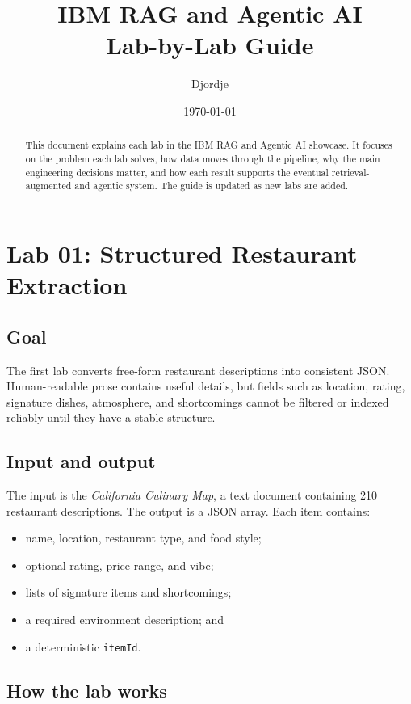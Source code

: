 \documentclass[11pt]{article}
\title{IBM RAG and Agentic AI\\Lab-by-Lab Guide}
\author{Djordje}
\date{\today}
\begin{document}
\maketitle

\begin{abstract}
This document explains each lab in the IBM RAG and Agentic AI showcase.
It focuses on the problem each lab solves, how data moves through the
pipeline, why the main engineering decisions matter, and how each result
supports the eventual retrieval-augmented and agentic system. The guide is
updated as new labs are added.
\end{abstract}

\tableofcontents
\newpage

\section{Lab 01: Structured Restaurant Extraction}

\subsection{Goal}

The first lab converts free-form restaurant descriptions into consistent JSON.
Human-readable prose contains useful details, but fields such as location,
rating, signature dishes, atmosphere, and shortcomings cannot be filtered or
indexed reliably until they have a stable structure.

\subsection{Input and output}

The input is the \emph{California Culinary Map}, a text document containing 210
restaurant descriptions. The output is a JSON array. Each item contains:

\begin{itemize}[nosep]
  \item name, location, restaurant type, and food style;
  \item optional rating, price range, and vibe;
  \item lists of signature items and shortcomings;
  \item a required environment description; and
  \item a deterministic \texttt{itemId}.
\end{itemize}

\subsection{How the lab works}
\end{document}
